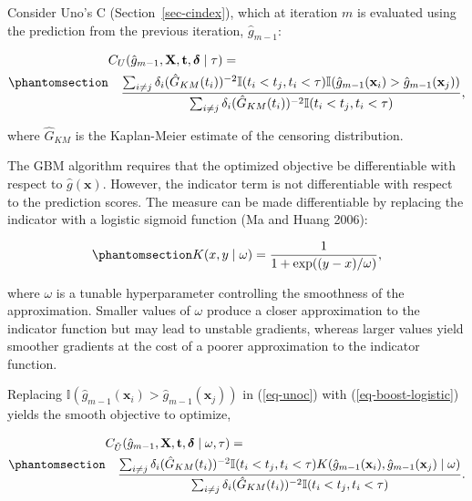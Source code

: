 \documentclass[
  letterpaper,
  krantz2]{style/krantz}
\begin{document}
Consider Uno's C (Section~\ref{sec-cindex}), which at iteration \(m\) is
evaluated using the prediction from the previous iteration,
\(\hat{g}_{m-1}\):

\begin{equation}\phantomsection\label{eq-unoc}{
\begin{aligned}
&C_U(\hat{g}_{m-1}, \mathbf{X}, \mathbf{t}, \boldsymbol{\delta}\mid \tau) =\\
&\quad\frac
{\sum_{i\neq j} \delta_i(\hat{G}_{KM}(t_i))^{-2}\mathbb{I}(t_i < t_j, t_i < \tau)\mathbb{I}(\hat{g}_{m-1}(\mathbf{x}_i) > \hat{g}_{m-1}(\mathbf{x}_j))}
{\sum_{i\neq j}\delta_i(\hat{G}_{KM}(t_i))^{-2}\mathbb{I}(t_i < t_j, t_i < \tau)},
\end{aligned}
}\end{equation}

where \(\hat{G}_{KM}\) is the Kaplan-Meier estimate of the censoring
distribution.

The GBM algorithm requires that the optimized objective be
differentiable with respect to \(\hat{g}(\mathbf{x})\). However, the
indicator term is not differentiable with respect to the prediction
scores. The measure can be made differentiable by replacing the
indicator with a logistic sigmoid function (Ma and Huang 2006):

\begin{equation}\phantomsection\label{eq-boost-logistic}{
K(x, y \mid \omega) = \frac{1}{1 + \exp((y - x)/\omega)},
}\end{equation}

where \(\omega\) is a tunable hyperparameter controlling the smoothness
of the approximation. Smaller values of \(\omega\) produce a closer
approximation to the indicator function but may lead to unstable
gradients, whereas larger values yield smoother gradients at the cost of
a poorer approximation to the indicator function.

Replacing
\(\mathbb{I}(\hat{g}_{m-1}(\mathbf{x}_i) > \hat{g}_{m-1}(\mathbf{x}_j))\)
in (\ref{eq-unoc}) with (\ref{eq-boost-logistic}) yields the smooth
objective to optimize,

\begin{equation}\phantomsection\label{eq-surv-gbm-cus}{
\begin{aligned}
&C_{\tilde{U}}(\hat{g}_{m-1}, \mathbf{X}, \mathbf{t}, \boldsymbol{\delta}\mid \omega, \tau) =\\
&\quad\frac{\sum_{i \neq j} \delta_i (\hat{G}_{KM}(t_i))^{-2}\mathbb{I}(t_i < t_j, t_i < \tau)K(\hat{g}_{m-1}(\mathbf{x}_i), \hat{g}_{m-1}(\mathbf{x}_j) \mid \omega)}
{\sum_{i \ne j} \delta_i (\hat{G}_{KM}(t_i))^{-2}\mathbb{I}(t_i < t_j, t_i < \tau)}.
\end{aligned}
}\end{equation}
\end{document}
